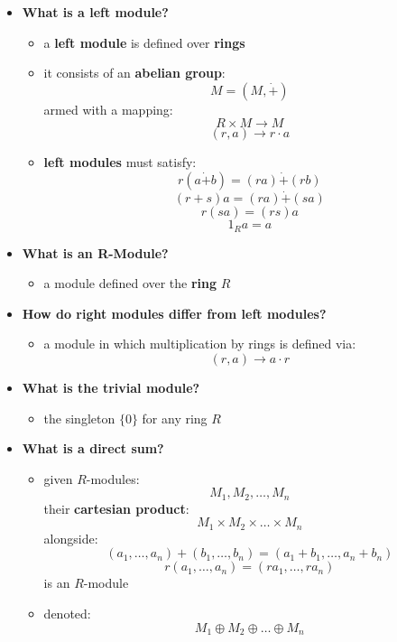 \documentclass{exam}
\begin{document}
\begin{itemize}
    \item \textbf{What is a left module?}
    \begin{itemize}
        \item a \textbf{left module} is defined over \textbf{rings}
        \item it consists of an \textbf{abelian group}:
        \[
        M = (M,\dot{+})
        \]
        armed with a mapping:
        \[
        R \times M \to M
        \]
        \[
        (r,a) \to r\cdot a
        \]
        \item \textbf{left modules} must satisfy:
        \[
        r(a \dot{+} b) = (ra) \dot{+} (rb)
        \]
        \[
        (r + s)a = (ra) \dot{+} (sa)
        \]
        \[
        r(sa) = (rs)a
        \]
        \[
        1_Ra = a
        \]
    \end{itemize}
    \item \textbf{What is an R-Module?}
    \begin{itemize}
        \item a module defined over the \textbf{ring} $R$
    \end{itemize}
    \item \textbf{How do right modules differ from left modules?}
    \begin{itemize}
        \item a module in which multiplication by rings is defined via:
        \[
        (r,a) \to a \cdot r
        \]
    \end{itemize}
    \item \textbf{What is the trivial module?}
    \begin{itemize}
        \item the singleton $\{0\}$ for any ring $R$
    \end{itemize}
    \item \textbf{What is a direct sum?}
    \begin{itemize}
        \item given $R$-modules:
        \[
        M_1, M_2, \ldots, M_n
        \]
        their \textbf{cartesian product}:
        \[
        M_1 \times M_2 \times\ldots \times M_n
        \]
        alongside:
        \[
        (a_1, \ldots, a_n) + (b_1, \ldots, b_n) = (a_1 + b_1, \ldots, a_n + b_n)
        \]
        \[
        r(a_1, \ldots, a_n) = (ra_1, \ldots, ra_n)
        \]
        is an $R$-module
        \item denoted:
        \[
        M_1 \oplus M_2 \oplus \ldots \oplus M_n
\]
\end{itemize}
\end{itemize}
\end{document}
